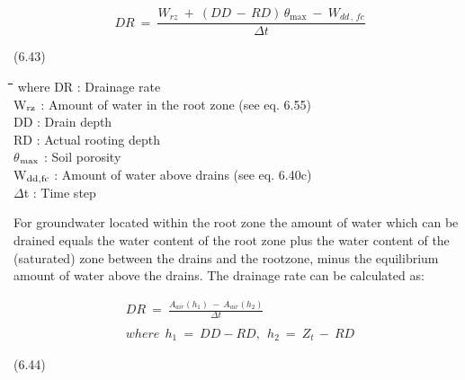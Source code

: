 \documentclass[11pt]{article}
\begin{document}
\begin{displaymath}
DR ~=~{\frac{W _{rz} ~+~ (DD\, -\, RD)\, \theta _{\max } ~-~ W _{dd\, ,\, fc} }{\Delta t}}
\end{displaymath}

 \bigskip
\strut\hfill (6.43)

\nwln
\begin{tabbing}
\hspace{1.27cm}\=\hspace{1.27cm}\=\hspace{1.27cm}\=\hspace{1.27cm}\=%
\hspace{1.27cm}\=\hspace{1.27cm}\=\hspace{1.27cm}\=\hspace{1.27cm}\=%
\hspace{1.27cm}\=\hspace{1.27cm}\=\kill
where\> DR\> : Drainage rate\> \> \> \> \> \> \> \> [cm d$^{{\rm -1}}$]\\
\>W$_{{\rm rz}}$\> : Amount of water in the root zone (see eq. 6.55)\> \> \> \> \> \> \> \> [cm]\\
\>DD\> : Drain depth\> \> \> \> \> \> \> \> [cm]\\
\>RD\> : Actual rooting depth\> \> \> \> \> \> \> \> [cm]\\
\>$\theta$$_{{\rm max}}$\> : Soil porosity\> \> \> \> \> \> \> \> [cm$^{{\rm 3}}$ cm$^{{\rm -3}}$]\\
\>W$_{{\rm dd,fc}}$\> : Amount of water above drains (see eq. 6.40c)\> \> \> \> \> \> \> \> [cm]\\
\>$\Delta$t\> : Time step\> \> \> \> \> \> \> \> [d]
\end{tabbing}

\bigskip
For groundwater located within the root zone the amount of water which can be drained
equals the water content of the root zone plus the water content of the (saturated) zone
between the drains and the rootzone, minus the equilibrium amount of water above the
drains. The drainage rate can be calculated as:

\begin{eqnarray*}
DR ~=~{\frac{A _{air} (h _{1} )~-~ A _{air} (h _{2} )}{\Delta t}} \nonumber  \\
\, \nonumber  \\
where ~~h _{1} ~=~DD -RD,~~h _{2} ~=~Z _{t~} -~RD
\end{eqnarray*}

 \bigskip
\strut\hfill (6.44)
\end{document}
